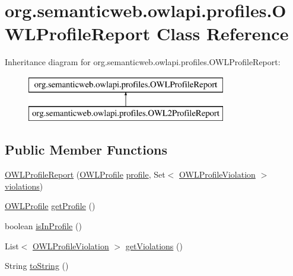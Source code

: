\hypertarget{classorg_1_1semanticweb_1_1owlapi_1_1profiles_1_1_o_w_l_profile_report}{\section{org.\-semanticweb.\-owlapi.\-profiles.\-O\-W\-L\-Profile\-Report Class Reference}
\label{classorg_1_1semanticweb_1_1owlapi_1_1profiles_1_1_o_w_l_profile_report}
}
Inheritance diagram for org.\-semanticweb.\-owlapi.\-profiles.\-O\-W\-L\-Profile\-Report\-:\begin{figure}[H]
\begin{center}
\leavevmode
\includegraphics[height=2.000000cm]{classorg_1_1semanticweb_1_1owlapi_1_1profiles_1_1_o_w_l_profile_report}
\end{center}
\end{figure}
\subsection*{Public Member Functions}
\begin{DoxyCompactItemize}
\item 
\hyperlink{classorg_1_1semanticweb_1_1owlapi_1_1profiles_1_1_o_w_l_profile_report_ae21775a8dcf1a6c48a134977178bd561}{O\-W\-L\-Profile\-Report} (\hyperlink{interfaceorg_1_1semanticweb_1_1owlapi_1_1profiles_1_1_o_w_l_profile}{O\-W\-L\-Profile} \hyperlink{classorg_1_1semanticweb_1_1owlapi_1_1profiles_1_1_o_w_l_profile_report_afa83cbee66be572072c3ebdcb986b684}{profile}, Set$<$ \hyperlink{classorg_1_1semanticweb_1_1owlapi_1_1profiles_1_1_o_w_l_profile_violation}{O\-W\-L\-Profile\-Violation} $>$ \hyperlink{classorg_1_1semanticweb_1_1owlapi_1_1profiles_1_1_o_w_l_profile_report_aa978b06f5c4f414bf77f5690ec071faf}{violations})
\item 
\hyperlink{interfaceorg_1_1semanticweb_1_1owlapi_1_1profiles_1_1_o_w_l_profile}{O\-W\-L\-Profile} \hyperlink{classorg_1_1semanticweb_1_1owlapi_1_1profiles_1_1_o_w_l_profile_report_ab6b0d8f20c232c30700015d8a9f58892}{get\-Profile} ()
\item 
boolean \hyperlink{classorg_1_1semanticweb_1_1owlapi_1_1profiles_1_1_o_w_l_profile_report_ae47ae21048c04d72d58b044c4272de5a}{is\-In\-Profile} ()
\item 
List$<$ \hyperlink{classorg_1_1semanticweb_1_1owlapi_1_1profiles_1_1_o_w_l_profile_violation}{O\-W\-L\-Profile\-Violation} $>$ \hyperlink{classorg_1_1semanticweb_1_1owlapi_1_1profiles_1_1_o_w_l_profile_report_aae4e96e80050d28fd0cfd0340332224c}{get\-Violations} ()
\item 
String \hyperlink{classorg_1_1semanticweb_1_1owlapi_1_1profiles_1_1_o_w_l_profile_report_aee06a800f659be486d2c78abe9a4226f}{to\-String} ()
\end{DoxyCompactItemize}
